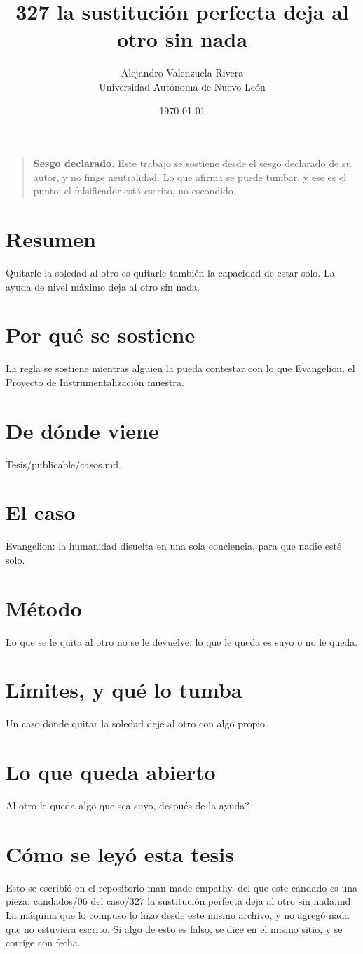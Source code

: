 \documentclass[11pt,a4paper]{article}
\title{327 la sustitución perfecta deja al otro sin nada}
\author{Alejandro Valenzuela Rivera\\\small Universidad Autónoma de Nuevo León}
\date{\today}
\begin{document}
\maketitle

\begin{quote}
\textbf{Sesgo declarado.} Este trabajo se sostiene desde el sesgo declarado de su autor, y no finge neutralidad. Lo que afirma se puede tumbar, y ese es el punto: el falsificador está escrito, no escondido.
\end{quote}

\section*{Resumen}
Quitarle la soledad al otro es quitarle también la capacidad de estar solo. La ayuda de nivel máximo deja al otro sin nada.

\section{Por qué se sostiene}
La regla se sostiene mientras alguien la pueda contestar con lo que Evangelion, el Proyecto de Instrumentalización muestra.

\section{De dónde viene}
Tesis/publicable/casos.md.

\section{El caso}
Evangelion: la humanidad disuelta en una sola conciencia, para que nadie esté solo.

\section{Método}
Lo que se le quita al otro no se le devuelve: lo que le queda es suyo o no le queda.

\section{Límites, y qué lo tumba}
Un caso donde quitar la soledad deje al otro con algo propio.

\section{Lo que queda abierto}
\textquestiondown{}Al otro le queda algo que sea suyo, después de la ayuda?

\section*{Cómo se leyó esta tesis}
Esto se escribió en el repositorio man-made-empathy, del que este candado es una pieza: candados/06 del caso/327 la sustitución perfecta deja al otro sin nada.md. La máquina que lo compuso lo hizo desde este mismo archivo, y no agregó nada que no estuviera escrito. Si algo de esto es falso, se dice en el mismo sitio, y se corrige con fecha.
\end{document}
